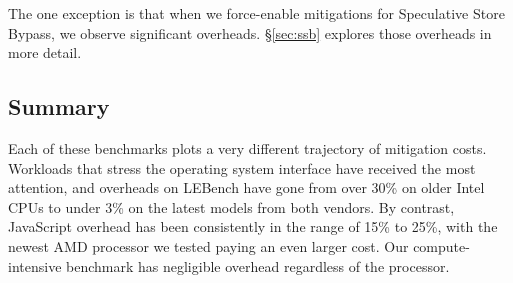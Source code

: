 The one exception is that when we force-enable mitigations for Speculative Store Bypass, we observe significant overheads.
\S\ref{sec:ssb} explores those overheads in more detail.

\subsection{Summary}
Each of these benchmarks plots a very different trajectory of mitigation costs.
Workloads that stress the operating system interface have received the most attention, and overheads on LEBench have gone from over 30\% on older Intel CPUs to under 3\% on the latest models from both vendors.
By contrast, JavaScript overhead has been consistently in the range of 15\% to 25\%, with the newest AMD processor we tested paying an even larger cost.
Our compute-intensive benchmark has negligible overhead regardless of the processor.
